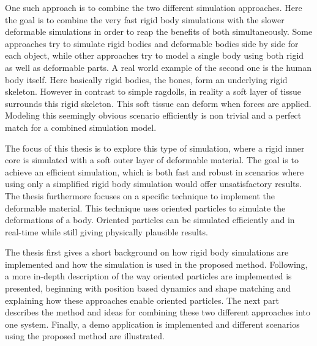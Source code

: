 One such approach is to combine the two different simulation approaches. Here the goal is to combine the very fast rigid body simulations with the slower deformable simulations in order to reap the benefits of both simultaneously. Some approaches try to simulate rigid bodies and deformable bodies side by side for each object, while other approaches try to model a single body using both rigid as well as deformable parts. A real world example of the second one is the human body itself. Here basically rigid bodies, the bones, form an underlying rigid skeleton. However in contrast to simple ragdolls, in reality a soft layer of tissue surrounds this rigid skeleton. This soft tissue can deform when forces are applied. Modeling this seemingly obvious scenario efficiently is non trivial and a perfect match for a combined simulation model.

The focus of this thesis is to explore this type of simulation, where a rigid inner core is simulated with a soft outer layer of deformable material. The goal is to achieve an efficient simulation, which is both fast and robust in scenarios where using only a simplified rigid body simulation would offer unsatisfactory results. The thesis furthermore focuses on a specific technique to implement the deformable material. This technique uses oriented particles to simulate the deformations of a body. Oriented particles can be simulated efficiently and in real-time while still giving physically plausible results.

The thesis first gives a short background on how rigid body simulations are implemented and how the simulation is used in the proposed method. Following, a more in-depth description of the way oriented particles are implemented is presented, beginning with position based dynamics and shape matching and explaining how these approaches enable oriented particles. The next part describes the method and ideas for combining these two different approaches into one system. Finally, a demo application is implemented and different scenarios using the proposed method are illustrated.